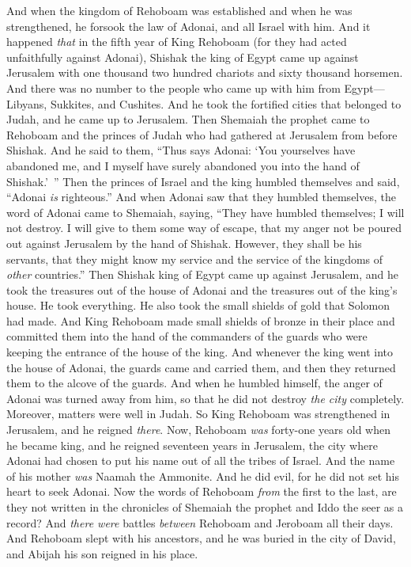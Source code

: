 \begin{biblechapter} %
 And when the kingdom of Rehoboam was established and when he was strengthened, he forsook the law of Adonai, and all Israel with him.
\verse And it happened \textit{that} in the fifth year of King Rehoboam (for they had acted unfaithfully against Adonai), Shishak the king of Egypt came up against Jerusalem
\verse with one thousand two hundred chariots and sixty thousand horsemen. And there was no number to the people who came up with him from Egypt—Libyans, Sukkites, and Cushites.
\verse And he took the fortified cities that belonged to Judah, and he came up to Jerusalem.
\verse Then Shemaiah the prophet came to Rehoboam and the princes of Judah who had gathered at Jerusalem from before Shishak. And he said to them, “Thus says Adonai: ‘You yourselves have abandoned me, and I myself have surely abandoned you into the hand of Shishak.’ ”
\verse Then the princes of Israel and the king humbled themselves and said, “Adonai \textit{is} righteous.”
\verse And when Adonai saw that they humbled themselves, the word of Adonai came to Shemaiah, saying, “They have humbled themselves; I will not destroy. I will give to them some way of escape, that my anger not be poured out against Jerusalem by the hand of Shishak.
\verse However, they shall be his servants, that they might know my service and the service of the kingdoms of \textit{other} countries.”
\verse Then Shishak king of Egypt came up against Jerusalem, and he took the treasures out of the house of Adonai and the treasures out of the king’s house. He took everything. He also took the small shields of gold that Solomon had made.
\verse And King Rehoboam made small shields of bronze in their place and committed them into the hand of the commanders of the guards who were keeping the entrance of the house of the king.
\verse And whenever the king went into the house of Adonai, the guards came and carried them, and then they returned them to the alcove of the guards.
\verse And when he humbled himself, the anger of Adonai was turned away from him, so that he did not destroy \textit{the city} completely. Moreover, matters were well in Judah.
 So King Rehoboam was strengthened in Jerusalem, and he reigned \textit{there}. Now, Rehoboam \textit{was} forty-one years old when he became king, and he reigned seventeen years in Jerusalem, the city where Adonai had chosen to put his name out of all the tribes of Israel. And the name of his mother \textit{was} Naamah the Ammonite.
\verse And he did evil, for he did not set his heart to seek Adonai.
\verse Now the words of Rehoboam \textit{from} the first to the last, are they not written in the chronicles of Shemaiah the prophet and Iddo the seer as a record? And \textit{there were} battles \textit{between} Rehoboam and Jeroboam all their days.
\verse And Rehoboam slept with his ancestors, and he was buried in the city of David, and Abijah his son reigned in his place.
\end{biblechapter}

